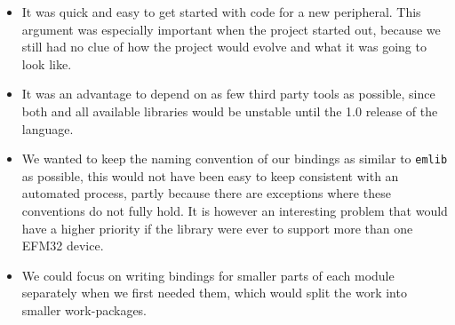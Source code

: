 \begin{itemize}
    \item It was quick and easy to get started with code for a new peripheral.
    This argument was especially important when the project started out, because we still had no clue of how the project would evolve and what it was going to look like.

    \item It was an advantage to depend on as few third party tools as possible, since both \rust and all available libraries would be unstable until the 1.0 release of the language.

    \item We wanted to keep the naming convention of our bindings as similar to \texttt{emlib} as possible, this would not have been easy to keep consistent with an automated process, partly because there are exceptions where these conventions do not fully hold.
    It is however an interesting problem that would have a higher priority if the library were ever to support more than one EFM32 device.

    \item We could focus on writing bindings for smaller parts of each module separately when we first needed them, which would split the work into smaller work-packages.
\end{itemize}
